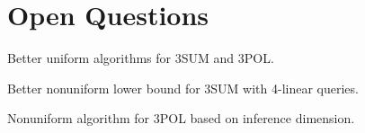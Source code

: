 \section{Open Questions}

Better uniform algorithms for 3SUM and 3POL.

Better nonuniform lower bound for 3SUM with 4-linear queries.

Nonuniform algorithm for 3POL based on inference dimension.
